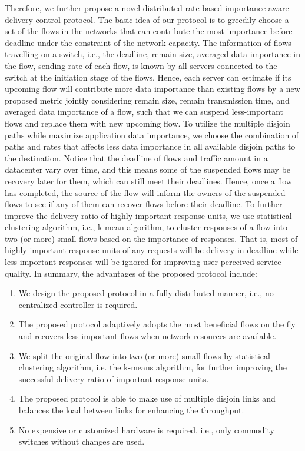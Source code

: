 \documentclass[conference]{IEEEtran}
\begin{document}
Therefore, we further propose a novel distributed rate-based importance-aware delivery control protocol. The basic idea of our protocol is to greedily choose a set of the flows in the networks that can contribute the most importance before deadline under the constraint of the network capacity. The information of flows travelling on a switch, i.e., the deadline, remain size, averaged data importance in the flow, sending rate of each flow, is known by all servers connected to the switch at the initiation stage of the flows. Hence, each server can estimate if its upcoming flow will contribute more data importance than existing flows by a new proposed metric jointly considering remain size, remain transmission time, and averaged data importance of a flow, such that we can suspend less-important flows and replace them with new upcoming flow. To utilize the multiple disjoin paths while maximize application data importance, we choose the combination of paths and rates that affects less data importance in all available disjoin paths to the destination. Notice that the deadline of flows and traffic amount in a datacenter vary over time, and this means some of the suspended flows may be recovery later for them, which can still meet their deadlines. Hence, once a flow has completed, the source of the flow will inform the owners of the suspended flows to see if any of them can recover flows before their deadline. To further improve the delivery ratio of highly important response units, we use statistical clustering algorithm, i.e., k-mean algorithm, to cluster responses of a flow into two (or more) small flows based on the importance of responses. That is, most of highly important response units of any requests will be delivery in deadline while less-important responses will be ignored for improving user perceived service quality.
In summary, the advantages of the proposed protocol include:

\begin{enumerate}
\item We design the proposed protocol in a fully distributed manner, i.e., no centralized controller is required.
\item The proposed protocol adaptively adopts the most beneficial flows on the fly and recovers less-important flows when network resources are available.
\item We split the original flow into two (or more) small flows by statistical clustering algorithm, i.e. the k-means algorithm, for further improving the successful delivery ratio of important response units.
\item The proposed protocol is able to make use of multiple disjoin links and balances the load between links for enhancing the throughput.
\item No expensive or customized hardware is required, i.e., only commodity switches without changes are used.
\end{enumerate}
\end{document}
